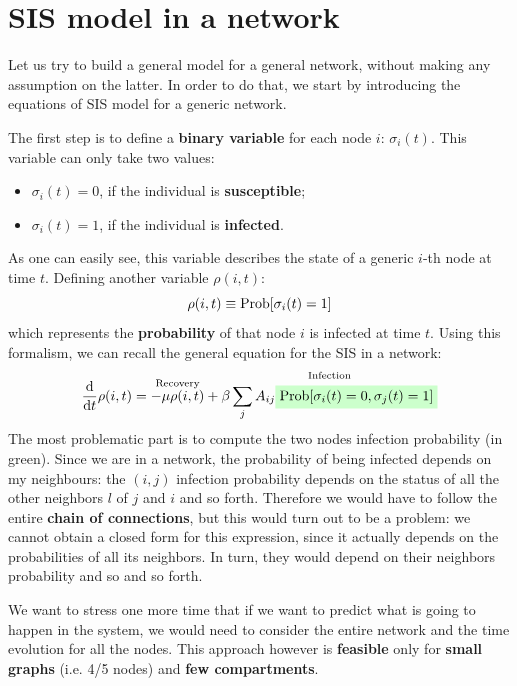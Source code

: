 \documentclass[../main/main.tex]{subfiles}
\begin{document}
\section{SIS model in a network}
Let us try to build a general model for a general network, without making any assumption on the latter. In order to do that, we start by introducing the equations of SIS model for a generic network.

The first step is to define a \textbf{binary variable} for each node \( i \): \( \sigma _i (t) \). This variable can only take two values:
\begin{itemize}
\item \( \sigma _i (t) = 0 \), if the individual is \textbf{susceptible};
\item \( \sigma _i (t) = 1 \), if the individual is \textbf{infected}.
\end{itemize}
As one can easily see, this variable describes the state of a generic $i$-th node at time $t$.
Defining another variable \( \rho (i,t) \):
\begin{equation*}
  \rho (i,t) \equiv \text{Prob} \qty[\sigma _i (t) = 1]
\end{equation*}
which represents the \textbf{probability} of that node \( i \) is infected at time \( t \).
Using this formalism, we can recall the general equation for the SIS in a network:
\begin{equation}
  \dv{}{t} \rho (i,t) = \overset{\text{Recovery}}{- \mu  \rho (i,t)} + \overset{\text{Infection}}{\beta \sum_{j}^{} A_{ij} \mathcolorbox{green!20}{\text{Prob} [\sigma _i (t) = 0, \sigma _j (t ) =1 ]   }}
\end{equation}
The most problematic part is to compute the two nodes infection probability (in green). Since we are in a network, the probability of being infected depends on my neighbours: the \( (i,j) \) infection probability depends on the status of all the other neighbors \( l \) of \( j \) and \( i \) and so forth.
Therefore we would have to follow the entire \textbf{chain of connections}, but this would turn out to be a problem: we cannot obtain a closed form for this expression, since it actually depends on the probabilities of all its neighbors. In turn, they would depend on their neighbors probability and so and so forth.

We want to stress one more time that if we want to predict what is going to happen in the system, we would need to consider the entire network and the time evolution for all the nodes. This approach however is \textbf{feasible} only for \textbf{small graphs} (i.e. 4/5 nodes) and \textbf{few compartments}.
\end{document}
